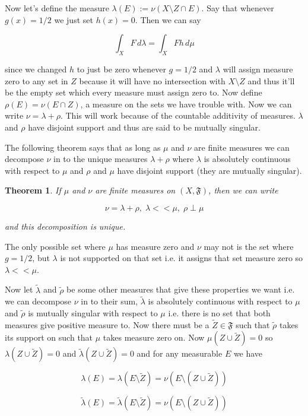 \documentclass[oneside]{book}
\newtheorem{theorem}{Theorem}[chapter]
\newenvironment{proof}[1][Proof]{\begin{trivlist}
\item[\hskip \labelsep {\bfseries #1}]}{\end{trivlist}}
\begin{document}
Now let's define the measure $\lambda(E) := \nu(X \setminus Z \cap E)$. Say that whenever $g(x)=1/2$ we just set $h(x)=0$. Then we can say

\begin{equation}
\int_X F\, d\lambda = \int_X Fh\,d\mu
\end{equation}

since we changed $h$ to just be zero whenever $g=1/2$ and $\lambda$ will assign measure zero to any set in $Z$ because it will have no intersection with $X \setminus Z$ and thus it'll be the empty set which every measure must assign zero to. Now define $\rho(E)= \nu(E \cap Z)$, a measure on the sets we have trouble with. Now we can write $\nu=\lambda + \rho$. This will work because of the countable additivity of measures. $\lambda$ and $\rho$ have disjoint support and thus are said to be mutually singular. 

The following theorem says that as long as $\mu$ and $\nu$ are finite measures we can decompose $\nu$ in to the unique measures $\lambda+\rho$ where $\lambda$ is absolutely continuous with respect to $\mu$ and $\rho$ and $\mu$ have disjoint support (they are mutually singular).

\begin{theorem}
If $\mu$ and $\nu$ are finite measures on $(X,\mathfrak{F})$, then we can write

\begin{equation}
\nu = \lambda + \rho,\; \lambda << \mu,\; \rho \perp \mu
\end{equation}

and this decomposition is unique.
\end{theorem}

\begin{proof}
The only possible set where $\mu$ has measure zero and $\nu$ may not is the set where $g=1/2$, but $\lambda$ is not supported on that set i.e. it assigns that set measure zero so $\lambda << \mu$.

Now let $\tilde{\lambda}$ and $\tilde{\rho}$ be some other measures that give these properties we want i.e. we can decompose $\nu$ in to their sum, $\tilde{\lambda}$ is absolutely continuous with respect to $\mu$ and $\tilde{\rho}$ is mutually singular with respect to $\mu$ i.e. there is no set that both measures give positive measure to. Now there must be a $\tilde{Z} \in \mathfrak{F}$ such that $\tilde{\rho}$ takes its support on such that $\mu$ takes measure zero on. Now $\mu(Z \cup \tilde{Z})=0$ so $\lambda(Z \cup \tilde{Z})=0$  and $\tilde{\lambda}(Z \cup \tilde{Z})=0$ and for any  measurable $E$ we have

\begin{equation}
\lambda(E) = \lambda(E \setminus \tilde{Z}) = \nu(E \setminus (Z \cup \tilde{Z}))
\end{equation}

\begin{equation}
\tilde{\lambda}(E) = \tilde{\lambda}(E \setminus \tilde{Z}) = \nu(E \setminus (Z \cup \tilde{Z}))
\end{equation}
\end{proof}
\end{document}
